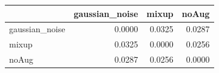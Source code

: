 \begin{tabular}{lrrr}
\toprule
 & gaussian_noise & mixup & noAug \\
\midrule
gaussian_noise & 0.0000 & 0.0325 & 0.0287 \\
mixup & 0.0325 & 0.0000 & 0.0256 \\
noAug & 0.0287 & 0.0256 & 0.0000 \\
\bottomrule
\end{tabular}

